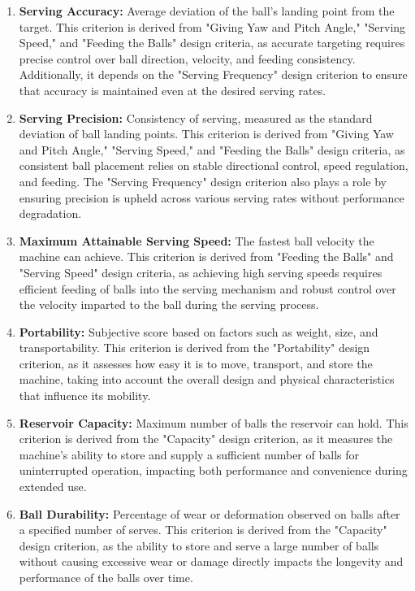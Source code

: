 \documentclass[12pt]{article}
\begin{document}
\begin{enumerate}
    \item \textbf{Serving Accuracy:} Average deviation of the ball's landing point from the target. This criterion is derived from "Giving Yaw and Pitch Angle," "Serving Speed," and "Feeding the Balls" design criteria, as accurate targeting requires precise control over ball direction, velocity, and feeding consistency. Additionally, it depends on the "Serving Frequency" design criterion to ensure that accuracy is maintained even at the desired serving rates.  


    \item \textbf{Serving Precision:} Consistency of serving, measured as the standard deviation of ball landing points. This criterion is derived from "Giving Yaw and Pitch Angle," "Serving Speed," and "Feeding the Balls" design criteria, as consistent ball placement relies on stable directional control, speed regulation, and feeding. The "Serving Frequency" design criterion also plays a role by ensuring precision is upheld across various serving rates without performance degradation.


    \item \textbf{Maximum Attainable Serving Speed:} The fastest ball velocity the machine can achieve. This criterion is derived from "Feeding the Balls" and "Serving Speed" design criteria, as achieving high serving speeds requires efficient feeding of balls into the serving mechanism and robust control over the velocity imparted to the ball during the serving process.


    \item \textbf{Portability:} Subjective score based on factors such as weight, size, and transportability. This criterion is derived from the "Portability" design criterion, as it assesses how easy it is to move, transport, and store the machine, taking into account the overall design and physical characteristics that influence its mobility.

    \item \textbf{Reservoir Capacity:} Maximum number of balls the reservoir can hold. This criterion is derived from the "Capacity" design criterion, as it measures the machine's ability to store and supply a sufficient number of balls for uninterrupted operation, impacting both performance and convenience during extended use.

    \item \textbf{Ball Durability:} Percentage of wear or deformation observed on balls after a specified number of serves. This criterion is derived from the "Capacity" design criterion, as the ability to store and serve a large number of balls without causing excessive wear or damage directly impacts the longevity and performance of the balls over time.


\end{enumerate}
\end{document}
